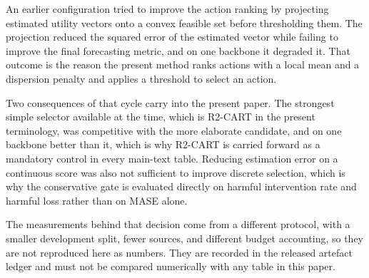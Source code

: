 \documentclass{article}
\begin{document}
An earlier configuration tried to improve the action ranking by projecting estimated utility
vectors onto a convex feasible set before thresholding them. The projection reduced the squared
error of the estimated vector while failing to improve the final forecasting metric, and on one
backbone it degraded it. That outcome is the reason the present method ranks actions with a
local mean and a dispersion penalty and applies a threshold to select an action.

Two consequences of that cycle carry into the present paper. The strongest simple selector
available at the time, which is R2-CART in the present terminology, was competitive with the
more elaborate candidate, and on one backbone better than it, which is why R2-CART is carried
forward as a mandatory control in every main-text table. Reducing estimation error on a
continuous score was also not sufficient to improve discrete selection, which is why the
conservative gate is evaluated directly on harmful intervention rate and harmful loss rather
than on MASE alone.

The measurements behind that decision come from a different protocol, with a smaller
development split, fewer sources, and different budget accounting, so they are not reproduced
here as numbers. They are recorded in the released artefact ledger and must not be compared
numerically with any table in this paper.
\end{document}
